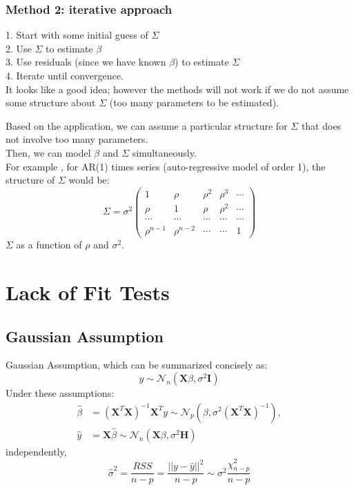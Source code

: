 \documentclass[11pt,a4paper]{article}
\begin{document}
\subsubsection{Method 2: iterative approach}
1. Start with some initial guess of $\Sigma$\\
2. Use $\Sigma$ to estimate $\beta$\\
3. Use residuals (since we have known $\beta$) to estimate $\Sigma$\\
4. Iterate until convergence.\\

It looks like a good idea; however the methods will not work if we do not assume some structure about $\Sigma$ (too many parameters to be estimated).

Based on the application, we can assume a particular structure for $\Sigma$ that does not involve too many parameters.\\
Then, we can model $\beta$ and $\Sigma$ simultaneously.\\
For example , for AR(1) times series (auto-regressive model of order 1),
the structure of $\Sigma$ would be:
$$\Sigma=\sigma^2 \begin{pmatrix}
    1& \rho& \rho^2& \rho^3& \cdots\\
    \rho& 1& \rho& \rho^2& \cdots \\
    \cdots & \cdots& \cdots &\cdots&\cdots \\
    \rho^{n-1}& \rho^{n-2}&\cdots&\cdots&1
\end{pmatrix}$$
$\Sigma$ as a function of $\rho$ and $\sigma^2$.

\section{Lack of Fit Tests}
\subsection{Gaussian Assumption}
Gaussian Assumption, which can be summarized concisely as:
$$y\sim \mathcal{N}_{n}(\mathbf{X}\beta, \sigma^2 \mathbf{I})$$
Under these assumptions:
\begin{equation}
    \begin{aligned}
        \hat{\beta}&=\left(\mathbf{X}^{T} \mathbf{X}\right)^{-1} \mathbf{X}^{T} y\sim \mathcal{N}_{p}(\beta,\sigma^2\left(\mathbf{X}^{T} \mathbf{X}\right)^{-1}),\\
        \hat{y}&=\mathbf{X}\hat{\beta}\sim \mathcal{N}_{n}(\mathbf{X}\beta, \sigma^2 \mathbf{H})
    \end{aligned}
    \nonumber
\end{equation}
independently,
$$\hat{\sigma}^2=\frac{RSS}{n-p}=\frac{||y-\hat{y}||^2}{n-p}\sim \sigma^2\frac{\chi^2_{n-p}}{n-p}$$
\end{document}
